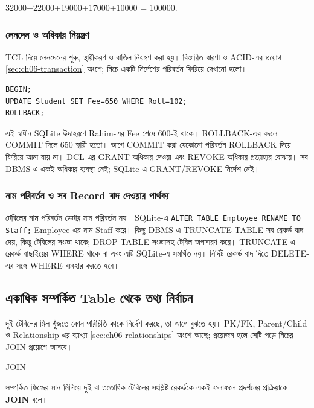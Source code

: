 \par 32000+22000+19000+17000+10000 = 100000.\par

\subsubsection{লেনদেন ও অধিকার নিয়ন্ত্রণ}
TCL দিয়ে লেনদেনের শুরু, স্থায়ীকরণ ও বাতিল নিয়ন্ত্রণ করা হয়। বিস্তারিত ধারণা ও ACID-এর প্রয়োগ \ref{sec:ch06-transaction} অংশে; নিচে একটি নির্দেশের পরিবর্তন ফিরিয়ে দেখানো হলো।
\par\noindent\begin{minipage}{\linewidth}
\begin{verbatim}
BEGIN;
UPDATE Student SET Fee=650 WHERE Roll=102;
ROLLBACK;
\end{verbatim}
\end{minipage}\par
এই স্বাধীন SQLite উদাহরণে Rahim-এর Fee শেষে 600-ই থাকে। ROLLBACK-এর বদলে COMMIT দিলে 650 স্থায়ী হতো। আগে COMMIT করা যেকোনো পরিবর্তন ROLLBACK দিয়ে ফিরিয়ে আনা যায় না। DCL-এর GRANT অধিকার দেওয়া এবং REVOKE অধিকার প্রত্যাহার বোঝায়। সব DBMS-এ একই অধিকার-ব্যবস্থা নেই; SQLite-এ GRANT/REVOKE নির্দেশ নেই।

\subsubsection{নাম পরিবর্তন ও সব Record বাদ দেওয়ার পার্থক্য}
টেবিলের নাম পরিবর্তন ডেটার মান পরিবর্তন নয়। SQLite-এ \texttt{ALTER TABLE Employee RENAME TO Staff;} Employee-এর নাম Staff করে। কিছু DBMS-এ TRUNCATE TABLE সব রেকর্ড বাদ দেয়, কিন্তু টেবিলের সংজ্ঞা থাকে; DROP TABLE সংজ্ঞাসহ টেবিল অপসারণ করে। TRUNCATE-এ রেকর্ড বাছাইয়ের WHERE থাকে না এবং এটি SQLite-এ সমর্থিত নয়। নির্দিষ্ট রেকর্ড বাদ দিতে DELETE-এর সঙ্গে WHERE ব্যবহার করতে হবে।
\subsection{একাধিক সম্পর্কিত Table থেকে তথ্য নির্বাচন}
\label{sec:ch06-join}
দুই টেবিলের মিল খুঁজতে কোন পরিচিতি কাকে নির্দেশ করছে, তা আগে বুঝতে হয়। PK/FK, Parent/Child ও Relationship-এর ব্যাখ্যা \ref{sec:ch06-relationships} অংশে আছে; প্রয়োজন হলে সেটি পড়ে নিচের JOIN প্রয়োগে আসবে।

\begin{definitionbox}{JOIN}

সম্পর্কিত ফিল্ডের মান মিলিয়ে দুই বা ততোধিক টেবিলের সংশ্লিষ্ট
রেকর্ডকে একই ফলাফলে প্রদর্শনের প্রক্রিয়াকে
\textbf{JOIN} বলে।

\end{definitionbox}

